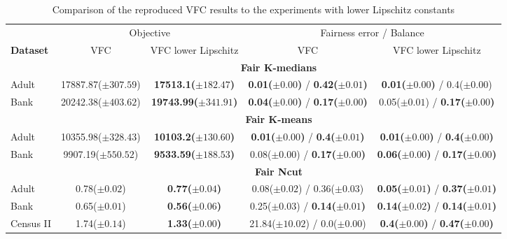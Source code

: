 \begin{table}[]
    \small
    \centering
    \begin{tabular}{|l|c|c|c|c|}
        \hline
        & \multicolumn{2}{c|}{Objective} &   \multicolumn{2}{c|}{Fairness error / Balance} \\ \cline{2-5}
        \textbf{Dataset} & VFC & VFC lower Lipschitz & VFC & VFC lower Lipschitz \\ \cline{2-5}
        & \multicolumn{4}{c|}{\textbf{Fair $\boldsymbol{K}$-medians}} \\
        \hline
        Adult & 17887.87($\pm 307.59$) & \textbf{17513.1($\pm 182.47$)} & \textbf{0.01($\pm 0.00$)} / \textbf{0.42($\pm 0.01$)} & \textbf{0.01($\pm 0.00$)} / 0.4($\pm 0.00$) \\
        Bank & 20242.38($\pm 403.62$) & \textbf{19743.99($\pm 341.91$)} & \textbf{0.04($\pm 0.00$)} / \textbf{0.17($\pm 0.00$)} & 0.05($\pm 0.01$) / \textbf{0.17($\pm 0.00$)} \\
        \hline
        & \multicolumn{4}{c|}{\textbf{Fair $\boldsymbol{K}$-means}} \\
            \cline{2-5}
        \hline
        Adult & 10355.98($\pm 328.43$) & \textbf{10103.2($\pm 130.60$)} & \textbf{0.01($\pm 0.00$)} / \textbf{0.4($\pm 0.01$)} & \textbf{0.01($\pm 0.00$)} / \textbf{0.4($\pm 0.00$)} \\
        Bank & 9907.19($\pm 550.52$) & \textbf{9533.59($\pm 188.53$)} & 0.08($\pm 0.00$) / \textbf{0.17($\pm 0.00$)} & \textbf{0.06($\pm 0.00$)} / \textbf{0.17($\pm 0.00$)} \\
        \hline
        & \multicolumn{4}{c|}{\textbf{Fair Ncut}} \\
            \cline{2-5}
        \hline
        Adult & 0.78($\pm 0.02$) & \textbf{0.77($\pm 0.04$)} & 0.08($\pm 0.02$) / 0.36($\pm 0.03$) & \textbf{0.05($\pm 0.01$)} / \textbf{0.37($\pm 0.01$)} \\
        Bank & 0.65($\pm 0.01$) & \textbf{0.56($\pm 0.06$)} & 0.25($\pm 0.03$) / \textbf{0.14($\pm 0.01$)} & \textbf{0.14($\pm 0.02$)} / \textbf{0.14($\pm 0.01$)} \\
        Census II & 1.74($\pm 0.14$) & \textbf{1.33($\pm 0.00$)} & 21.84($\pm 10.02$) / 0.0($\pm 0.00$) & \textbf{0.4($\pm 0.00$)} / \textbf{0.47($\pm 0.00$)} \\
        \hline        
    \end{tabular}
    \caption{Comparison of the reproduced VFC results to the experiments with lower Lipschitz constants}
    \label{tab:comparison_lmbda-tuned-allVSLipschitz-test}
\end{table}

